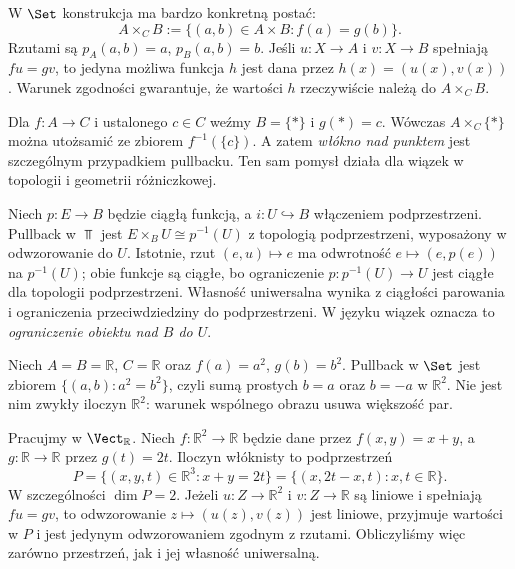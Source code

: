 \begin{przyklad}\label{przyklad:włokna}
W $\Set$ konstrukcja ma bardzo konkretną postać:
\[
A\times_C B:=\{(a,b)\in A\times B:f(a)=g(b)\}.
\]
Rzutami są $p_A(a,b)=a$, $p_B(a,b)=b$. Jeśli $u:X\to A$ i $v:X\to B$ spełniają $fu=gv$, to jedyna możliwa funkcja $h$ jest dana przez $h(x)=(u(x),v(x))$. Warunek zgodności gwarantuje, że wartości $h$ rzeczywiście należą do $A\times_C B$.
\end{przyklad}

\begin{przyklad}
Dla $f:A\to C$ i ustalonego $c\in C$ weźmy $B=\{*\}$ i $g(*)=c$. Wówczas $A\times_C\{*\}$ można utożsamić ze zbiorem $f^{-1}(\{c\})$. A zatem \emph{włókno nad punktem} jest szczególnym przypadkiem pullbacku. Ten sam pomysł działa dla wiązek w topologii i geometrii różniczkowej.
\end{przyklad}

\begin{przyklad}
Niech $p:E\to B$ będzie ciągłą funkcją, a $i:U\hookrightarrow B$ włączeniem podprzestrzeni. Pullback w $\Top$ jest $E\times_B U\cong p^{-1}(U)$ z topologią podprzestrzeni, wyposażony w odwzorowanie do $U$. Istotnie, rzut $(e,u)\mapsto e$ ma odwrotność $e\mapsto(e,p(e))$ na $p^{-1}(U)$; obie funkcje są ciągłe, bo ograniczenie $p:p^{-1}(U)\to U$ jest ciągłe dla topologii podprzestrzeni. Własność uniwersalna wynika z ciągłości parowania i ograniczenia przeciwdziedziny do podprzestrzeni. W języku wiązek oznacza to \emph{ograniczenie obiektu nad $B$ do $U$}.
\end{przyklad}

\begin{przyklad}
Niech $A=B=\mathbb R$, $C=\mathbb R$ oraz $f(a)=a^2$, $g(b)=b^2$. Pullback w $\Set$ jest zbiorem $\{(a,b):a^2=b^2\}$, czyli sumą prostych $b=a$ oraz $b=-a$ w $\mathbb R^2$. Nie jest nim zwykły iloczyn $\mathbb R^2$: warunek wspólnego obrazu usuwa większość par.
\end{przyklad}


\begin{przyklad}
Pracujmy w $\Vect_{\mathbb R}$. Niech $f:\mathbb R^2\to\mathbb R$ będzie dane przez $f(x,y)=x+y$, a $g:\mathbb R\to\mathbb R$ przez $g(t)=2t$. Iloczyn włóknisty to podprzestrzeń
\[
P=\{(x,y,t)\in\mathbb R^3:x+y=2t\}=\{(x,2t-x,t):x,t\in\mathbb R\}.
\]
W szczególności $\dim P=2$. Jeżeli $u:Z\to\mathbb R^2$ i $v:Z\to\mathbb R$ są liniowe i spełniają $fu=gv$, to odwzorowanie $z\mapsto(u(z),v(z))$ jest liniowe, przyjmuje wartości w $P$ i jest jedynym odwzorowaniem zgodnym z rzutami. Obliczyliśmy więc zarówno przestrzeń, jak i jej własność uniwersalną.
\end{przyklad}

